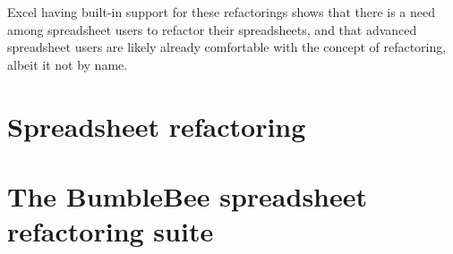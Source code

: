 Excel having built-in support for these refactorings shows that there is a need among spreadsheet users to refactor their spreadsheets, and that advanced spreadsheet users are likely already comfortable with the concept of refactoring, albeit it not by name.

\section{Spreadsheet refactoring}

\section{The BumbleBee spreadsheet refactoring suite}